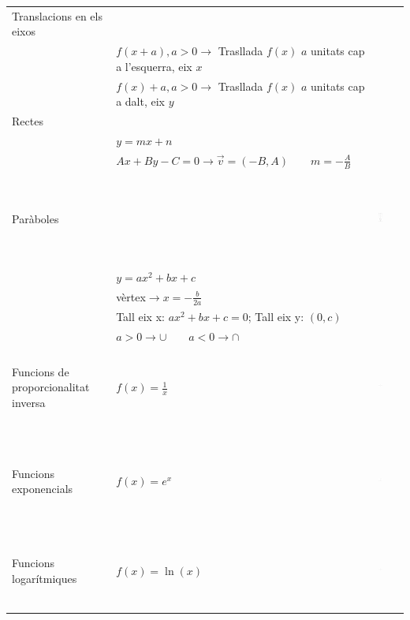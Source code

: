 \documentclass{article}
\begin{document}
\begin{center}
\begin{longtable}{ | l |l|l|}
    Translacions en els eixos& & \\
    & $f(x+a), a>0\rightarrow$ Trasllada $f(x)$ $a$ unitats cap a l'esquerra, eix $x$& \\
    & $f(x)+a, a>0\rightarrow$ Trasllada $f(x)$ $a$ unitats cap a dalt, eix $y$& \\
    \hline
    Rectes& & \\
    &$y=mx+n$&\\
    &$Ax+By-C=0\rightarrow \overrightarrow{v}=(-B,A)\qquad m=-\frac{A}{B}$&\\
    \hline
    Paràboles& & \includegraphics[width=0.2\textwidth, height=30mm]{eq_2n_grau.png}\\
    &$y=ax^2+bx+c$&\\
    &vèrtex$\rightarrow x=-\frac{b}{2a}$&\\
    &Tall eix x: $ax^2+bx+c=0$; Tall eix y: $(0,c)$&\\
    &$a>0\rightarrow \cup \qquad a<0\rightarrow \cap$&\\
     \hline
    Funcions de proporcionalitat inversa& $f(x)=\frac{1}{x}$& \includegraphics[width=0.2\textwidth, height=25mm]{funcio_prop_inversa.png}\\
    &&\\
    \hline
    Funcions exponencials& $f(x)=e^{x}$& \includegraphics[width=0.2\textwidth, height=30mm]{funcio_exp.png}\\
    \hline
    Funcions logarítmiques& $f(x)=\ln (x)$& \includegraphics[width=0.2\textwidth, height=25mm]{funcio_ln.png} \\

\end{longtable}
\end{center}
\end{document}
